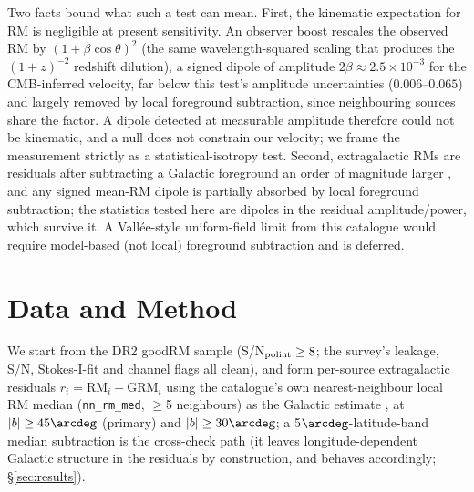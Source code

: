 \documentclass[twocolumn]{aastex631}
\newcommand{\code}[1]{\texttt{#1}}
\begin{document}
Two facts bound what such a test can mean. First, the kinematic expectation for RM is
negligible at present sensitivity. An observer boost
rescales the observed RM by $(1+\beta\cos\theta)^2$ (the same wavelength-squared scaling that
produces the $(1+z)^{-2}$ redshift dilution), a signed dipole of amplitude
$2\beta \approx 2.5\times10^{-3}$ for the CMB-inferred velocity, far below this test's amplitude
uncertainties ($0.006$--$0.065$) and largely removed by local foreground subtraction, since
neighbouring sources share the factor. A dipole detected at measurable amplitude therefore could
not be kinematic, and a null does not constrain our velocity; we frame the measurement strictly
as a statistical-isotropy test.
Second, extragalactic RMs are residuals after subtracting a Galactic foreground an order of
magnitude larger \citep{mao2010}, and any signed mean-RM dipole is partially absorbed by
local foreground subtraction; the statistics tested here are dipoles in the residual
amplitude/power, which survive it. A Vall\'ee-style uniform-field limit from this
catalogue would require model-based (not local) foreground subtraction and is deferred.

\section{Data and Method}
\label{sec:method}
We start from the DR2 goodRM sample (S/N$_{\rm polint}\ge8$; the survey's leakage, S/N,
Stokes-I-fit and channel flags all clean), and form per-source extragalactic residuals
$r_i = \mathrm{RM}_i - \mathrm{GRM}_i$ using the catalogue's own nearest-neighbour local RM
median (\code{nn\_rm\_med}, $\ge$5 neighbours) as the Galactic estimate \citep{malik2026}, at
$|b|\ge45\arcdeg$ (primary) and $|b|\ge30\arcdeg$; a 5$\arcdeg$-latitude-band median
subtraction is the cross-check path (it leaves longitude-dependent Galactic structure in the
residuals by construction, and behaves accordingly; \S\ref{sec:results}).
\end{document}

